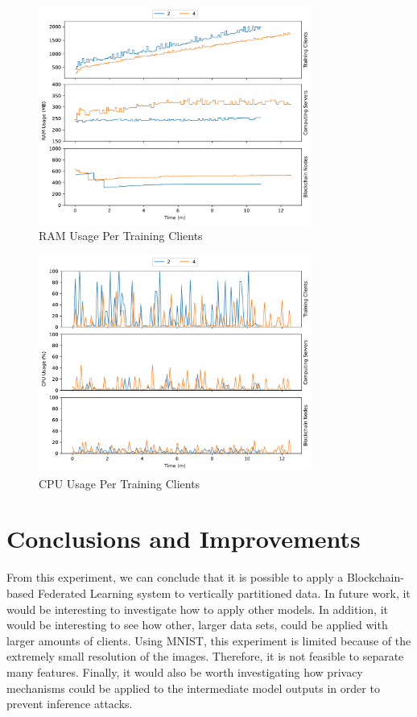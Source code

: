 \begin{figure}[!ht]
    \centering
    \centering
    \includegraphics[width=0.8\textwidth]{graphics/vertical/ram.pdf}
    \caption{RAM Usage Per Training Clients}
    \label{fig:ram_vertical}
\end{figure}

\begin{figure}[!ht]
    \centering
    \centering
    \includegraphics[width=0.8\textwidth]{graphics/vertical/cpu.pdf}
    \caption{CPU Usage Per Training Clients}
    \label{fig:cpu_vertical}
\end{figure}

\section{Conclusions and Improvements}

From this experiment, we can conclude that it is possible to apply a Blockchain-based Federated Learning system to vertically partitioned data. In future work, it would be interesting to investigate how to apply other models. In addition, it would be interesting to see how other, larger data sets, could be applied with larger amounts of clients. Using MNIST, this experiment is limited because of the extremely small resolution of the images. Therefore, it is not feasible to separate many features. Finally, it would also be worth investigating how privacy mechanisms could be applied to the intermediate model outputs in order to prevent inference attacks.

